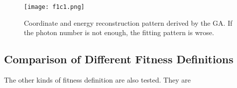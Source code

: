 \begin{figure}
    \centering
    \texttt{[image: f1c1.png]}
    \caption[Coordinate and enery reconstruction without threshold]
{
Coordinate and energy reconstruction pattern derived by the GA.
If the photon number is not enough, the fitting pattern is wrose.
}
    \label{fig:f1c1}
    \end{figure}

%
%
%
%
%
%
%
%
%
%
%
%
%
%
%
%
%
%
%


\subsection {Comparison of Different Fitness Definitions}



The other kinds of fitness definition are also tested. They are

